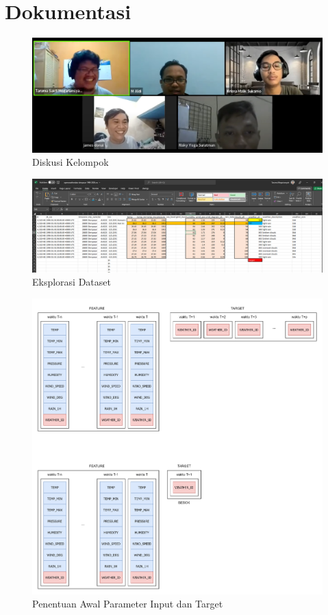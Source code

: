\documentclass[12pt, a4paper]{article}
\begin{document}
\bigskip
\section*{Dokumentasi}

\begin{figure}[h!]
  \includegraphics[width=\linewidth]{pert-1.png}
  \caption{Diskusi Kelompok}
\end{figure}

\begin{figure}[h!]
  \includegraphics[width=\linewidth]{pert-11.png}
  \caption{Eksplorasi Dataset}
\end{figure}

\begin{figure}[h!]
  \includegraphics[width=\linewidth]{pert-12.png}
  \caption{Penentuan Awal Parameter Input dan Target}
\end{figure}
\end{document}
